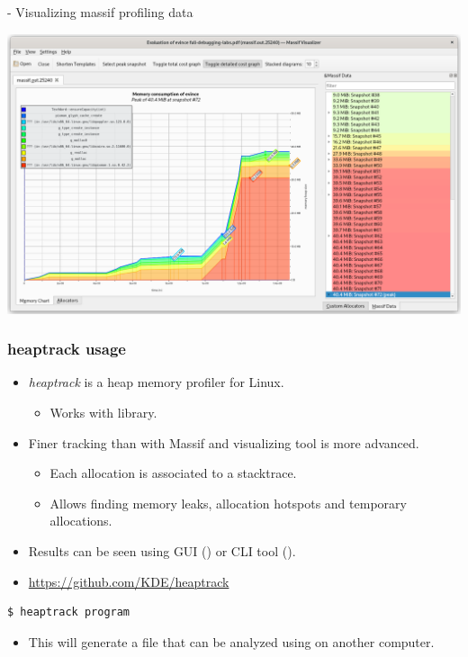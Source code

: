 \begin{frame}{ - Visualizing massif profiling data}
  \begin{center}
    \includegraphics[height=0.8\textheight]{slides/debugging-application-profiling/massif_visualizer.png}
  \end{center}
\end{frame}

\begin{frame}[fragile]
  \frametitle{heaptrack usage}
  \begin{itemize}
    \item {\em heaptrack} is a heap memory profiler for Linux.
    \begin{itemize}
      \item Works with  library.
    \end{itemize}
    \item Finer tracking than with Massif and visualizing tool is more advanced.
    \begin{itemize}
      \item Each allocation is associated to a stacktrace.
      \item Allows finding memory leaks, allocation hotspots and
            temporary allocations.
    \end{itemize}
    \item Results can be seen using GUI () or CLI tool
          ().
    \item \url{https://github.com/KDE/heaptrack}
  \end{itemize}
  \begin{block}{}
    \begin{verbatim}
$ heaptrack program
    \end{verbatim}
  \end{block}
  \begin{itemize}
    \item This will generate a  file
    that can be analyzed using  on another computer.
  \end{itemize}
\end{frame}

